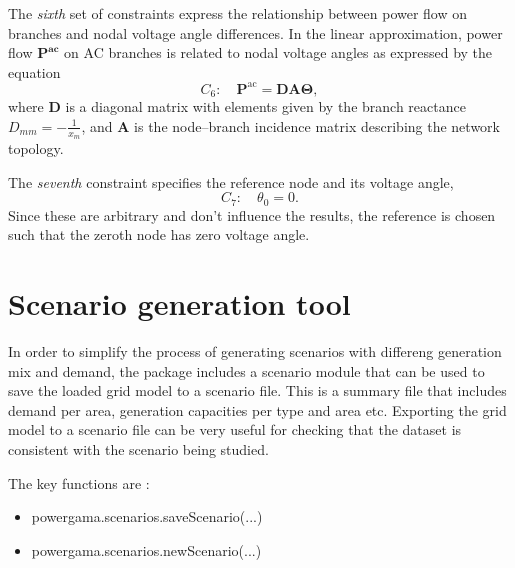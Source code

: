 \documentclass{article}
\begin{document}
The \emph{sixth} set of constraints express the relationship between power flow on branches and nodal voltage angle differences.
In the linear approximation, power flow $\mathbf{P^\text{ac}}$ on AC branches is related to nodal voltage angles as expressed by the equation
\begin{equation}
	C_6:\quad \mathbf{P}^\text{ac} = \mathbf{D A \Theta},
\end{equation}
where $\mathbf{D}$ is a diagonal matrix with elements given by the branch reactance $D_{mm} =-\frac{1}{x_m}$,  and $\mathbf{A}$ is the node--branch incidence matrix describing the network topology.



The \emph{seventh} constraint specifies the reference node and its voltage angle,
\begin{equation}
	C_7:\quad 
	\theta_0 = 0.
\end{equation}
Since these are arbitrary and don't influence the results, the reference is chosen such that the zeroth node has zero voltage angle.



\section{Scenario generation tool}

In order to simplify the process of generating scenarios with differeng generation mix and demand, the package includes a scenario module that can be used to save the loaded grid model to a scenario file. This is a summary file that includes demand per area, generation capacities per type and area etc. Exporting the grid model to a scenario file can be very useful for checking that the dataset is consistent with the scenario being studied.

The key functions are :
\begin{itemize}
\item powergama.scenarios.saveScenario(...)
\item powergama.scenarios.newScenario(...)
\end{itemize}
\end{document}
